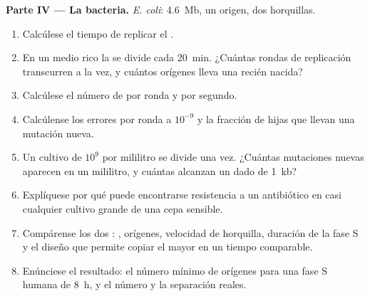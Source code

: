 \begin{problem}
\medskip
\noindent\textbf{Parte IV --- La bacteria.}
\emph{E. coli}: \qty{4.6}{Mb}, un origen, dos horquillas.
\begin{enumerate}[resume]
  \item Calcúlese el tiempo de replicar el .
  \item En un medio rico la  se divide cada \qty{20}{min}. ¿Cuántas
        rondas de replicación transcurren a la vez, y cuántos orígenes
        lleva una  recién nacida?
  \item Calcúlese el número de  por ronda y por
        segundo.
  \item Calcúlense los errores por ronda a $10^{-9}$ y la fracción de
         hijas que llevan una mutación nueva.
  \item Un cultivo de $10^9$  por mililitro se divide una vez.
        ¿Cuántas mutaciones nuevas aparecen en un mililitro, y cuántas
        alcanzan un  dado de \qty{1}{kb}?
  \item Explíquese por qué puede encontrarse resistencia a un antibiótico
        en casi cualquier cultivo grande de una cepa sensible.
  \item Compárense los dos : , orígenes, velocidad
        de horquilla, duración de la fase S y el diseño que permite copiar
        el  mayor en un tiempo comparable.
  \item Enúnciese el resultado: el número mínimo de orígenes para una fase
        S humana de \qty{8}{h}, y el número y la separación reales.
\end{enumerate}
\end{problem}

